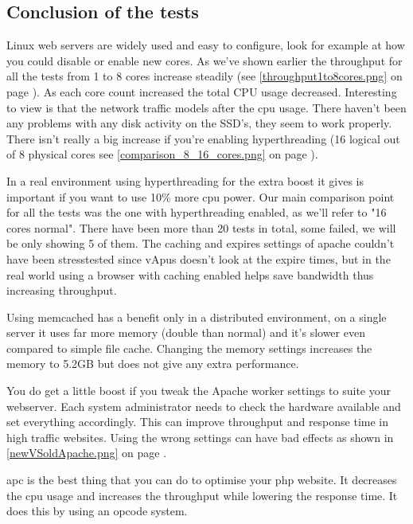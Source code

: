 \subsection{Conclusion of the tests}
Linux web servers are widely used and easy to configure, look for example at how you could disable or enable new cores.
As we've shown earlier the throughput for all the tests from 1 to 8 cores increase steadily (see \autoref{throughput1to8cores.png} on page \pageref{throughput1to8cores.png}). 
As each core count increased the total CPU usage decreased. 
Interesting to view is that the network traffic models after the \gls{cpu} usage. There haven't been any problems with any disk activity on the SSD's, they seem to work properly.
There isn't really a big increase if you're enabling \gls{hyperthreading} (16 logical out of 8 physical cores see \autoref{comparison_8_16_cores.png} on page \pageref{comparison_8_16_cores.png}).

In a real environment using \gls{hyperthreading} for the extra boost it gives is important if you want to use 10\% more \gls{cpu} power. Our main comparison point for all the tests was the one with \gls{hyperthreading} enabled, as we'll refer to "16 cores normal". 
There have been more than 20 tests in total, some failed, we will be only showing 5 of them.
The caching and expires settings of \gls{apache} couldn't have been stresstested since vApus doesn't look at the expire times, but in the real world using a browser with caching enabled helps save bandwidth thus increasing throughput.

Using \gls{memcached} has a benefit only in a distributed environment, on a single server it uses far more memory (double than normal) and it's slower even compared to simple file cache. Changing the memory settings increases the memory to 5.2GB but does not give any extra performance.

You do get a little boost if you tweak the Apache worker settings to suite your webserver. Each system administrator needs to check the hardware available and set everything accordingly.
This can improve throughput and response time in high traffic websites. Using the wrong settings can have bad effects as shown in  \autoref{newVSoldApache.png} on page \pageref{newVSoldApache.png}.

\gls{apc} is the best thing that you can do to optimise your \gls{php} website. It decreases the \gls{cpu} usage and increases the throughput while lowering the response time. It does this by using an opcode system. 

